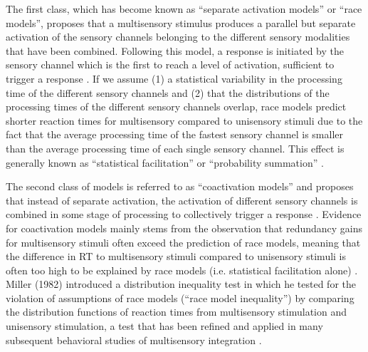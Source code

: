 \documentclass[12pt]{article}
\begin{document}
%
\par The first class, which has become known as “separate activation models” or “race models”, proposes that a multisensory stimulus produces a parallel but separate activation of the sensory channels belonging to the different sensory modalities that have been combined. Following this model, a response is initiated by the sensory channel which is the first to reach a level of activation, sufficient to trigger a response \parencite{calvert_handbook_2004, miller_divided_1982,miller_timecourse_1986,raab_division_1962}. If we assume (1) a statistical variability in the processing time of the different sensory channels and (2) that the distributions of the processing times of the different sensory channels overlap, race models predict shorter reaction times for multisensory compared to unisensory stimuli due to the fact that the average processing time of the fastest sensory channel is smaller than the average processing time of each single sensory channel. This effect is generally known as “statistical facilitation” or “probability summation” \parencite{miller_divided_1982,raab_division_1962}. 
%
\par The second class of models is referred to as “coactivation models” and proposes that instead of separate activation, the activation of different sensory channels is combined in some stage of processing to collectively trigger a response \parencite{miller_divided_1982,miller_timecourse_1986}. Evidence for coactivation models mainly stems from the observation that redundancy gains for multisensory stimuli often exceed the prediction of race models, meaning that the difference in RT to multisensory stimuli compared to unisensory stimuli is often too high to be explained by race models (i.e. statistical facilitation alone) \parencite{miller_divided_1982,miller_timecourse_1986}. Miller (1982) introduced a distribution inequality test in which he tested for the violation of assumptions of race models (“race model inequality”) by comparing the distribution functions of reaction times from multisensory stimulation and unisensory stimulation, a test that has been refined and applied in many subsequent behavioral studies of multisensory integration \parencite{colonius_race_2006, diederich_probability_1992,forster_redundant_2002,giard_auditory-visual_1999,girard_multisensory_2011, gondan_testing_2008}.
\end{document}
